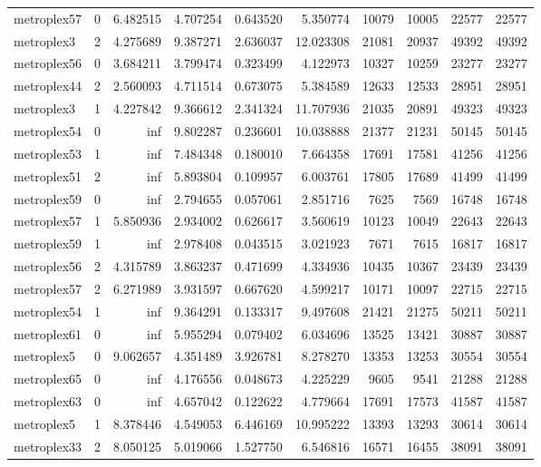 \begin{longtable}{|l|r|r|r|r|r|r|r|r|r|}
metroplex57 & 0 & 6.482515 & 4.707254 & 0.643520 & 5.350774 & 10079 & 10005 & 22577 & 22577 \\
metroplex3 & 2 & 4.275689 & 9.387271 & 2.636037 & 12.023308 & 21081 & 20937 & 49392 & 49392 \\
metroplex56 & 0 & 3.684211 & 3.799474 & 0.323499 & 4.122973 & 10327 & 10259 & 23277 & 23277 \\
metroplex44 & 2 & 2.560093 & 4.711514 & 0.673075 & 5.384589 & 12633 & 12533 & 28951 & 28951 \\
metroplex3 & 1 & 4.227842 & 9.366612 & 2.341324 & 11.707936 & 21035 & 20891 & 49323 & 49323 \\
metroplex54 & 0 & inf & 9.802287 & 0.236601 & 10.038888 & 21377 & 21231 & 50145 & 50145 \\
metroplex53 & 1 & inf & 7.484348 & 0.180010 & 7.664358 & 17691 & 17581 & 41256 & 41256 \\
metroplex51 & 2 & inf & 5.893804 & 0.109957 & 6.003761 & 17805 & 17689 & 41499 & 41499 \\
metroplex59 & 0 & inf & 2.794655 & 0.057061 & 2.851716 & 7625 & 7569 & 16748 & 16748 \\
metroplex57 & 1 & 5.850936 & 2.934002 & 0.626617 & 3.560619 & 10123 & 10049 & 22643 & 22643 \\
metroplex59 & 1 & inf & 2.978408 & 0.043515 & 3.021923 & 7671 & 7615 & 16817 & 16817 \\
metroplex56 & 2 & 4.315789 & 3.863237 & 0.471699 & 4.334936 & 10435 & 10367 & 23439 & 23439 \\
metroplex57 & 2 & 6.271989 & 3.931597 & 0.667620 & 4.599217 & 10171 & 10097 & 22715 & 22715 \\
metroplex54 & 1 & inf & 9.364291 & 0.133317 & 9.497608 & 21421 & 21275 & 50211 & 50211 \\
metroplex61 & 0 & inf & 5.955294 & 0.079402 & 6.034696 & 13525 & 13421 & 30887 & 30887 \\
metroplex5 & 0 & 9.062657 & 4.351489 & 3.926781 & 8.278270 & 13353 & 13253 & 30554 & 30554 \\
metroplex65 & 0 & inf & 4.176556 & 0.048673 & 4.225229 & 9605 & 9541 & 21288 & 21288 \\
metroplex63 & 0 & inf & 4.657042 & 0.122622 & 4.779664 & 17691 & 17573 & 41587 & 41587 \\
metroplex5 & 1 & 8.378446 & 4.549053 & 6.446169 & 10.995222 & 13393 & 13293 & 30614 & 30614 \\
metroplex33 & 2 & 8.050125 & 5.019066 & 1.527750 & 6.546816 & 16571 & 16455 & 38091 & 38091 \\

\end{longtable}
